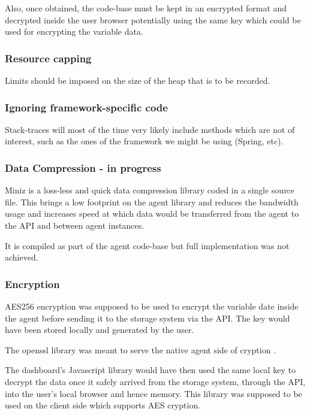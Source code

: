 Also, once obtained, the code-base must be kept in an encrypted format and decrypted inside the user browser potentially using the same key which could be used for encrypting the variable data.

\subsubsection{Resource capping}
Limits should be imposed on the size of the heap that is to be recorded.

\subsubsection{Ignoring framework-specific code}

Stack-traces will most of the time very likely include methods which are not of interest, such as the ones of the framework we might be using (Spring, etc).

\subsubsection{Data Compression - in progress}

Miniz \cite{miniz} is a loss-less and quick data compression library coded in a single source file. This brings a low footprint on the agent library and reduces the bandwidth usage and increases speed at which data would be transferred from the agent to the API and between agent instances.

It is compiled as part of the agent code-base but full implementation was not achieved.

\subsubsection{Encryption}
AES256 encryption was supposed to be used to encrypt the variable date inside the agent before sending it to the storage system via the API. The key would have been stored locally and generated by the user.

The openssl library was meant to serve the native agent side of cryption \cite{openssl}.

The dashboard's Javascript library would have then used the same local key to decrypt the data once it safely arrived from the storage system, through the API, into the user's local browser and hence memory. This library was supposed to be used on the client side \cite{cryptojs} which supports AES cryption.

